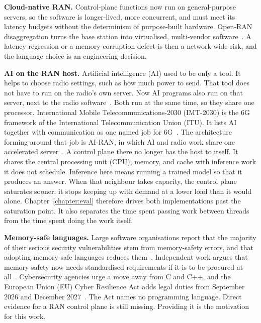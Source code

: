 \documentclass[english,oneside,a4paper,censored,csm,software-track-2020]{HYthesisML}
\begin{document}
\begin{compactitem}
\item \textbf{Cloud-native RAN.} Control-plane functions now run on general-purpose
servers, so the software is longer-lived, more concurrent, and must meet
its latency budgets without the determinism of purpose-built hardware.
Open-RAN disaggregation turns the base station into virtualised,
multi-vendor software~\cite{polese2023oran}. A latency regression or a
memory-corruption defect is then a network-wide risk, and the language
choice is an engineering decision.

\item \textbf{AI on the RAN host.} Artificial intelligence (AI) used to be only a tool.
It helps to choose radio settings, such as how much power to send. That tool does
not have to run on the radio's own server. Now AI programs also run on that
server, next to the radio software~\cite{polese2026airan}. Both run at the same
time, so they share one processor. International Mobile
Telecommunications-2030 (IMT-2030) is the 6G framework of the
International Telecommunication Union (ITU). It lists AI together with
communication as one named job for 6G~\cite{itu2023imt2030}. The architecture
forming around that job is AI-RAN, in which AI and radio work share one
accelerated server~\cite{airan2026orchestrator}. A control plane there
no longer has the host to itself. It shares the central processing unit
(CPU), memory, and cache with inference work it does not schedule. Inference
here means running a trained model so that it produces an answer. When
that neighbour takes capacity, the control plane saturates sooner: it
stops keeping up with demand at a lower load than it would alone.
Chapter~\ref{chapter:eval} therefore drives both implementations past the saturation point.
It also separates the time spent passing work between threads from the time
spent doing the work itself.

\item \textbf{Memory-safe languages.} Large software organisations report that the
majority of their serious security vulnerabilities stem from memory-safety errors,
and that adopting memory-safe languages reduces
them~\cite{msrc2019memory,google2022android,vanderstoep2025android,google2024securebydesign}.
Independent work argues that memory safety now needs standardised
requirements if it is to be procured at
all~\cite{watson2025memorysafety}. Cybersecurity agencies urge a move
away from C and C++, and the European Union (EU) Cyber Resilience Act
adds legal duties from September 2026 and December
2027~\cite{cisa2023memorysafe,oncd2024building,eu2024cra}. The Act names
no programming language. Direct evidence for a RAN control plane is
still missing. Providing it is the motivation for this work.
\end{compactitem}
\end{document}
